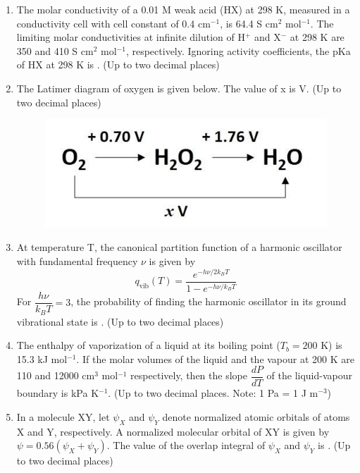 \documentclass{article}
\begin{document}
\begin{enumerate}
\item The molar conductivity of a 0.01 M weak acid (HX) at 298 K, measured in a conductivity 
cell with cell constant of 0.4 cm$^{-1}$, is 64.4 S cm$^2$ mol$^{-1}$. The limiting molar conductivities at 
infinite dilution of H$^+$ and X$^-$ at 298 K are 350 and 410 S cm$^2$ mol$^{-1}$, respectively. 
Ignoring activity coefficients, the pKa of HX at 298 K is \underline{\hspace{2cm}}. (Up to two decimal places)

\item The Latimer diagram of oxygen is given below. The value of x is \underline{\hspace{2cm}} V. (Up to two decimal places)
\begin{figure}[H]
    \centering
    \includegraphics[width=0.5\columnwidth]{figures/cy_q45.png}
    \label{fig:placeholder}
\end{figure}

\item At temperature T, the canonical partition function of a harmonic oscillator with fundamental 
frequency $\nu$ is given by
\[
q_{\text{vib}}(T) = \frac{e^{-h\nu/2k_BT}}{1 - e^{-h\nu/k_BT}}
\]
For $\dfrac{h\nu}{k_BT} = 3$, the probability of finding the harmonic oscillator in its ground 
vibrational state is \underline{\hspace{2cm}}. (Up to two decimal places)

\item The enthalpy of vaporization of a liquid at its boiling point ($T_b = 200$ K) is 15.3 kJ mol$^{-1}$. 
If the molar volumes of the liquid and the vapour at 200 K are 110 and 12000 cm$^3$ mol$^{-1}$ 
respectively, then the slope $\dfrac{dP}{dT}$ of the liquid-vapour boundary is \underline{\hspace{2cm}} kPa K$^{-1}$. 
(Up to two decimal places. Note: 1 Pa = 1 J m$^{-3}$)

\item In a molecule XY, let $\psi_X$ and $\psi_Y$ denote normalized atomic orbitals of atoms X and Y, 
respectively. A normalized molecular orbital of XY is given by 
$\psi = 0.56(\psi_X + \psi_Y)$.  
The value of the overlap integral of $\psi_X$ and $\psi_Y$ is \underline{\hspace{2cm}}. (Up to two decimal places)


\end{enumerate}
\end{document}

